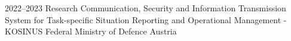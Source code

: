 \cventry
{2022--2023}
{Research}
{Communication, Security and Information Transmission System for Task-specific Situation Reporting and Operational Management - KOSINUS}
{Federal Ministry of Defence}
{Austria}
{
}

